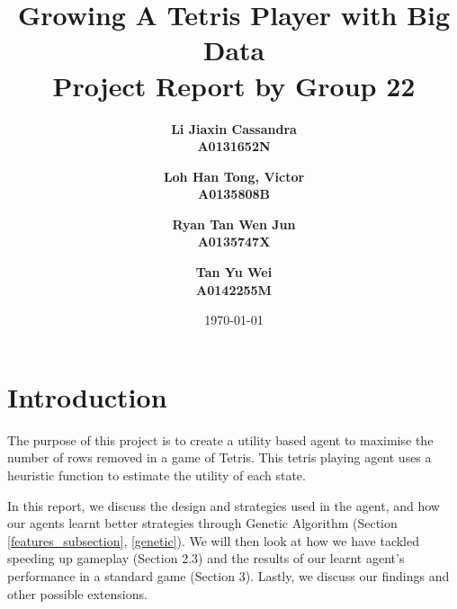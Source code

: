 \documentclass[a4paper,12pt,twocolumn]{article}
\begin{document}

\title{
    Growing A Tetris Player with Big Data\\
    \large Project Report by Group 22
}
\author{
    \bf{Li Jiaxin Cassandra}\\ 
    A0131652N
    \and
    \bf{Loh Han Tong, Victor}\\
    A0135808B
    \and
    \bf{Ryan Tan Wen Jun}\\
    A0135747X
    \and
    \bf{Tan Yu Wei}\\
    A0142255M
}
\date{\today}
\maketitle

\section{Introduction}
The purpose of this project is to create a utility based agent to maximise the
number of rows removed in a game of Tetris. This tetris playing agent uses a heuristic
function to estimate the utility of each state.

In this report, we discuss the design and strategies used in the agent, and how our
agents learnt better strategies through Genetic Algorithm (Section \ref{features_subsection}, \ref{genetic}).
We will then look at how we have tackled speeding up gameplay (Section 2.3) and the
results of our learnt agent's performance in a standard game (Section 3). Lastly,
we discuss our findings and other possible extensions.


\end{document}
